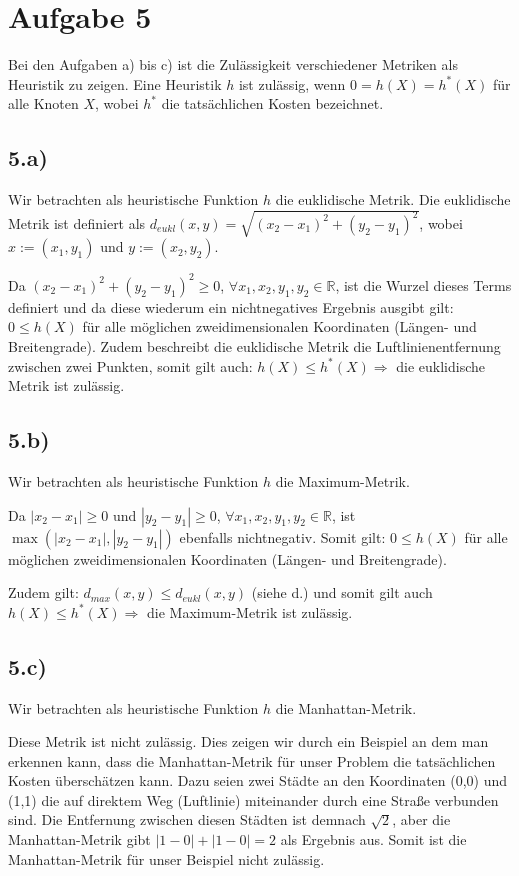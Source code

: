 \documentclass[a4paper]{article}
\newcommand{\IR}{\mathbb{R}}
\begin{document}
\section*{Aufgabe 5}
Bei den Aufgaben a) bis c) ist die Zul\"assigkeit verschiedener Metriken als Heuristik zu zeigen. Eine Heuristik $h$ ist zul\"assig, wenn $0 = h(X) = h^\ast(X)$ f\"ur alle Knoten $X$, wobei $h^\ast$ die tats\"achlichen Kosten bezeichnet.

\subsection*{5.a)}
Wir betrachten als heuristische Funktion $h$ die euklidische Metrik. Die euklidische Metrik ist definiert als $d_{eukl}(x,y) = \sqrt{(x_2-x_1)^2+(y_2-y_1)^2} $, wobei $x:=(x_1,y_1)$ und $y:=(x_2,y_2)$. 

Da $(x_2-x_1)^2+(y_2-y_1)^2\geq0$, $\forall x_1,x_2,y_1,y_2 \in \IR$, ist die Wurzel dieses Terms definiert und da diese wiederum ein nichtnegatives Ergebnis ausgibt gilt: $0 \leq h(X)$ f\"ur alle m\"oglichen zweidimensionalen Koordinaten (L\"angen- und Breitengrade). Zudem beschreibt die euklidische Metrik die Luftlinienentfernung zwischen zwei Punkten, somit gilt auch: $h(X) \leq h^\ast(X) \Rightarrow$ die euklidische Metrik ist zul\"assig.

\subsection*{5.b)}
Wir betrachten als heuristische Funktion $h$ die Maximum-Metrik.

Da $|x_2-x_1| \geq 0$ und $|y_2-y_1| \geq 0$, $\forall x_1,x_2,y_1,y_2 \in \IR$, ist $\max(|x_2-x_1|,|y_2-y_1|)$ ebenfalls nichtnegativ. Somit gilt: $0 \leq h(X)$ f\"ur alle m\"oglichen zweidimensionalen Koordinaten (L\"angen- und Breitengrade).

Zudem gilt: $d_{max}(x,y) \leq d_{eukl}(x,y)$ (siehe d.) und somit gilt auch $h(X) \leq h^\ast(X) \Rightarrow$ die Maximum-Metrik ist zul\"assig.

\subsection*{5.c)}
Wir betrachten als heuristische Funktion $h$ die Manhattan-Metrik.

Diese Metrik ist nicht zul\"assig. Dies zeigen wir durch ein Beispiel an dem man erkennen kann, dass die Manhattan-Metrik f\"ur unser Problem die tats\"achlichen Kosten \"ubersch\"atzen kann. Dazu seien zwei St\"adte an den Koordinaten (0,0) und (1,1) die auf direktem Weg (Luftlinie) miteinander durch eine Stra{\ss}e verbunden sind.
Die Entfernung zwischen diesen St\"adten ist demnach $\sqrt{2}$, aber die Manhattan-Metrik gibt $|1 - 0| + |1 - 0| = 2$ als Ergebnis aus. Somit ist die Manhattan-Metrik f\"ur unser Beispiel nicht zul\"assig.
\end{document}
